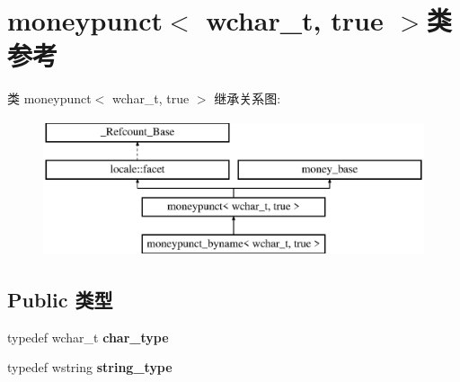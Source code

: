 \hypertarget{classmoneypunct_3_01wchar__t_00_01true_01_4}{}\section{moneypunct$<$ wchar\+\_\+t, true $>$类 参考}
\label{classmoneypunct_3_01wchar__t_00_01true_01_4}
类 moneypunct$<$ wchar\+\_\+t, true $>$ 继承关系图\+:\begin{figure}[H]
\begin{center}
\leavevmode
\includegraphics[height=4.000000cm]{classmoneypunct_3_01wchar__t_00_01true_01_4}
\end{center}
\end{figure}
\subsection*{Public 类型}
\begin{DoxyCompactItemize}
\item 
\mbox{\label{classmoneypunct_3_01wchar__t_00_01true_01_4_a22f753baaf9d71757f1bdc7e7707f4a1}} 
typedef wchar\+\_\+t {\bfseries char\+\_\+type}
\item 
\mbox{\label{classmoneypunct_3_01wchar__t_00_01true_01_4_a3d2bcf5b943cb5eee40b7c89c4a78de6}} 
typedef wstring {\bfseries string\+\_\+type}
\end{DoxyCompactItemize}
